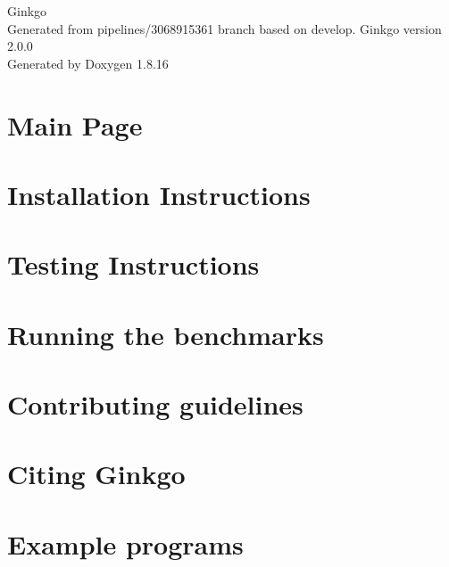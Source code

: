 \let\mypdfximage\pdfximage\def\pdfximage{\immediate\mypdfximage}\documentclass[twoside]{book}
\newcommand{\+}{\discretionary{\mbox{\scriptsize$\hookleftarrow$}}{}{}}
\newcommand{\clearemptydoublepage}{%
  \newpage{\pagestyle{empty}\cleardoublepage}%
}
\begin{document}
\hypersetup{pageanchor=false,
             bookmarksnumbered=true,
             pdfencoding=unicode
            }
\begin{titlepage}
\vspace*{7cm}
\begin{center}%
{\Large Ginkgo \\[1ex]\large Generated from pipelines/3068915361 branch based on develop. Ginkgo version 2.\+0.\+0 }\\
\vspace*{1cm}
{\large Generated by Doxygen 1.8.16}\\
\end{center}
\end{titlepage}
\clearemptydoublepage
{}
\tableofcontents
\clearemptydoublepage
{}
\hypersetup{pageanchor=true}

\chapter{Main Page}
\label{index}\hypertarget{index}{}
\chapter{Installation Instructions}
\label{install_ginkgo}

\chapter{Testing Instructions}
\label{testing_ginkgo}

\chapter{Running the benchmarks}
\label{benchmarking_ginkgo}

\chapter{Contributing guidelines}
\label{contributing_guidelines}

\chapter{Citing Ginkgo}
\label{citing_ginkgo}

\chapter{Example programs}
\label{Examples}

\end{document}
